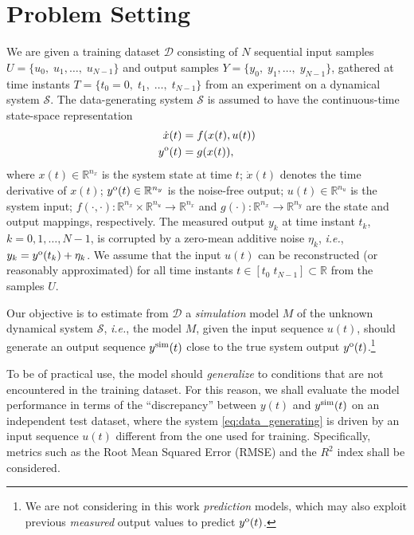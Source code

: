 \documentclass{article} %
\newcommand{\So}{{\mathcal{S}}}            %
\newcommand{\nin}{n_u}
\newcommand{\ny}{n_y}
\newcommand{\nx}{n_x}
\newcommand{\nsamp}{N}
\newcommand{\Yid}{Y}
\newcommand{\Uid}{U}
\newcommand{\Did}{{\mathcal{D}}}
\newcommand{\simul}[1]{{#1}^{\rm sim}}
\newcommand{\ymodel}{y^{\rm o}}
\begin{document}
\section{Problem Setting}
\label{sec:settings}
We are given a {training} dataset $\Did$ consisting of $\nsamp$ {sequential} input samples $\Uid = \{u_{0},\;u_{1},\dots,\;u_{\nsamp-1}\}$ and output samples  $\Yid = \{y_{0},\;y_{1},\dots,\;y_{\nsamp-1}\}$, gathered at time instants $T = \{t_0=0,\; t_1,\; \dots,\; t_{\nsamp-1} \}$ from an experiment on a dynamical system $\So$.  The data-generating system $\So$ is assumed to have the continuous-time state-space representation
\begin{subequations}
\label{eq:data_generating}
\begin{align}
 \dot x(t) &= f(x(t), u(t)) \\
 \ymodel(t)  &= g(x(t)),
\end{align}
\end{subequations}
where $x(t) \in \mathbb{R}^{\nx}$ is the system state at time $t$; $\dot x(t)$ denotes the  time derivative of $x(t)$; $\ymodel(t) \in \mathbb{R}^{\ny}$ is the noise-free output; $u(t) \in \mathbb{R}^{\nin}$ is the system  input; $f(\cdot, \cdot): \mathbb{R}^{\nx} \times \mathbb{R}^{\nin} \rightarrow \mathbb{R}^{\nx}$ and $g(\cdot): \mathbb{R}^{\nx} \rightarrow \mathbb{R}^{\ny}$ are the state and output mappings, respectively.
The measured output $y_k$ at time instant $t_k$, $k=0,1,\dots,\nsamp -1$, is  corrupted by a zero-mean additive noise $\eta_k$, \emph{i.e.}, $y_k =  \ymodel(t_k)  + \eta_k$. We assume that the input $u(t)$ can be  reconstructed (or reasonably approximated) for all time instants $t \in [t_0\; t_{N-1}] \subset \mathbb{R}$ from the samples $U$. 


{Our objective is to estimate from $\Did$ a \emph{simulation} model $M$ of the unknown dynamical system $\So$, \emph{i.e.}, the model $M$, given the input sequence $u(t)$, should generate an output sequence $\simul{y}(t)$ close to the true system output $\ymodel(t)$.\footnote{{We are not considering in this work \emph{prediction} models, which may also exploit previous 
\emph{measured} output values to predict $\ymodel(t)$}.}
}

{To be of practical use, the model should \emph{generalize} to conditions that are not encountered in the training dataset. For this reason, we shall evaluate the model performance in terms of the ``discrepancy''  between $y(t)$ and $\simul{y}(t)$ on an independent test dataset, where the system \eqref{eq:data_generating} is driven by an input sequence $u(t)$ different from the one used for training. Specifically, metrics such as the Root Mean Squared Error (RMSE) and the $R^2$ index shall be considered.}
\end{document}
